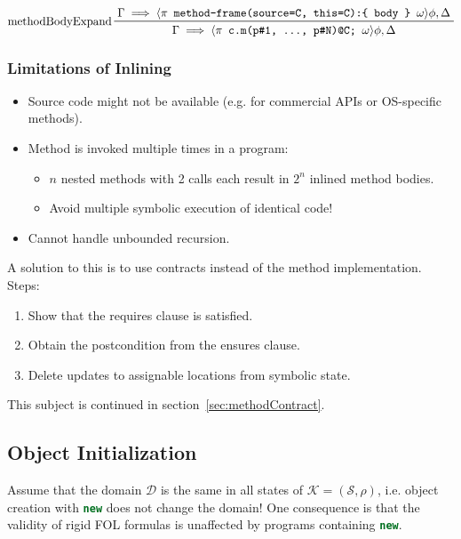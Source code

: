 \documentclass[a4paper, 11pt, accentcolor = tud3b]{tudreport}
\newcommand{\inlineJava}[1]{\lstinline[language = Java]|#1|}
\begin{document}
				\begin{equation*}
					\prftree[l]
						{methodBodyExpand}
						{\Gamma \implies \langle \pi \texttt{ method-frame(source=C, this=C):\{ body \} } \omega \rangle \phi, \Delta}
						{\Gamma \implies \langle \pi \texttt{ c.m(p\#1, ..., p\#N)@C; } \omega\rangle \phi, \Delta}
				\end{equation*}
				
				\subsubsection{Limitations of Inlining}
					\label{sec:methodContractMotivation}
				
					\begin{itemize}
						\item Source code might not be available (e.g. for commercial APIs or OS-specific methods).
						\item Method is invoked multiple times in a program:
							\begin{itemize}
								\item \(n\) nested methods with 2 calls each result in \(2^n\) inlined method bodies.
								\item Avoid multiple symbolic execution of identical code!
							\end{itemize}
						\item Cannot handle unbounded recursion.
					\end{itemize}
				
					A solution to this is to use contracts instead of the method implementation. Steps:
					\begin{enumerate}
						\item Show that the requires clause is satisfied.
						\item Obtain the postcondition from the ensures clause.
						\item Delete updates to assignable locations from symbolic state.
					\end{enumerate}
					This subject is continued in section~\ref{sec:methodContract}.
			
			\subsection{Object Initialization}
				Assume that the domain \(\mathcal{D}\) is the same in all states of \( \mathcal{K} = (\mathcal{S}, \rho) \), i.e. object creation with \inlineJava{new} does not change the domain! One consequence is that the validity of rigid FOL formulas is unaffected by programs containing \inlineJava{new}.
				
\end{document}
